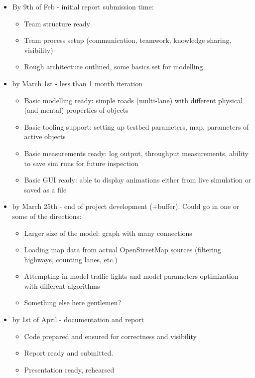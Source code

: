 \begin{itemize}
\begin{itemize}
	    \item By 9th of Feb - initial report submission time:
	    \begin{itemize}
	        \item Team structure ready
	        \item Team process setup (communication, teamwork, knowledge sharing, visibility)
	        \item Rough architecture outlined, some basics set for modelling
	    \end{itemize}

	    \item by March 1st - less than 1 month iteration
	    \begin{itemize}
	        \item Basic modelling ready: simple roads (multi-lane) with different physical (and mental) properties of objects
	        \item Basic tooling support: setting up testbed parameters, map, parameters of active objects
	        \item Basic measurements ready: log output, throughput measurements, ability to save sim runs for future inspection
	        \item Basic GUI ready: able to display animations either from live simulation or saved as a file
	    \end{itemize}

	    \item by March 25th - end of project development (+buffer). Could go in one or some of the directions:
	    \begin{itemize}
	        \item Larger size of the model: graph with many connections
	        \item Loading map data from actual OpenStreetMap sources (filtering highways, counting lanes, etc.)
	        \item Attempting in-model traffic lights and model parameters optimization with different algorithms
	        \item Something else here gentlemen?
	    \end{itemize}

	    \item by 1st of April - documentation and report
	    \begin{itemize}
	        \item Code prepared and ensured for correctness and visibility
	        \item Report ready and submitted.
	        \item Presentation ready, rehearsed
	    \end{itemize}


\end{itemize}
\end{itemize}
